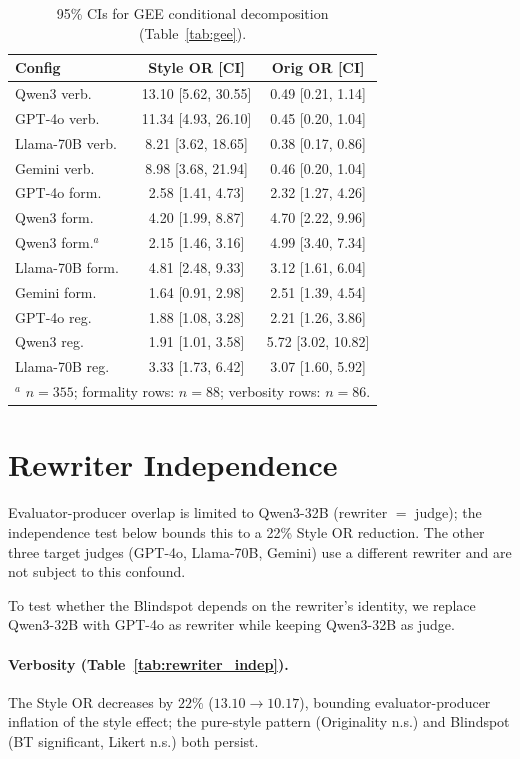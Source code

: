 \begin{table}[h]
\centering
\small
\caption{95\% CIs for GEE conditional decomposition (Table~\ref{tab:gee}).}
\label{tab:gee_ci}
\begin{tabular}{@{}lcc@{}}
\toprule
Config & Style OR [CI] & Orig OR [CI] \\
\midrule
Qwen3 verb.\ & 13.10 [5.62, 30.55] & 0.49 [0.21, 1.14] \\
GPT-4o verb.\ & 11.34 [4.93, 26.10] & 0.45 [0.20, 1.04] \\
Llama-70B verb.\ & 8.21 [3.62, 18.65] & 0.38 [0.17, 0.86] \\
Gemini verb.\ & 8.98 [3.68, 21.94] & 0.46 [0.20, 1.04] \\
GPT-4o form.\ & 2.58 [1.41, 4.73] & 2.32 [1.27, 4.26] \\
Qwen3 form.\ & 4.20 [1.99, 8.87] & 4.70 [2.22, 9.96] \\
Qwen3 form.$^a$ & 2.15 [1.46, 3.16] & 4.99 [3.40, 7.34] \\
Llama-70B form.\ & 4.81 [2.48, 9.33] & 3.12 [1.61, 6.04] \\
Gemini form.\ & 1.64 [0.91, 2.98] & 2.51 [1.39, 4.54] \\
GPT-4o reg.\ & 1.88 [1.08, 3.28] & 2.21 [1.26, 3.86] \\
Qwen3 reg.\ & 1.91 [1.01, 3.58] & 5.72 [3.02, 10.82] \\
Llama-70B reg.\ & 3.33 [1.73, 6.42] & 3.07 [1.60, 5.92] \\
\bottomrule
\multicolumn{3}{l}{\footnotesize $^a$ $n = 355$; formality rows: $n = 88$; verbosity rows: $n = 86$.}
\end{tabular}
\end{table}

\section{Rewriter Independence}
\label{app:rewriter_indep}

Evaluator-producer overlap is limited to Qwen3-32B (rewriter $=$ judge); the independence test below bounds this to a 22\% Style OR reduction. The other three target judges (GPT-4o, Llama-70B, Gemini) use a different rewriter and are not subject to this confound.

To test whether the Blindspot depends on the rewriter's identity, we replace Qwen3-32B with GPT-4o as rewriter while keeping Qwen3-32B as judge.

\paragraph{Verbosity (Table~\ref{tab:rewriter_indep}).}
The Style OR decreases by $22\%$ ($13.10 \to 10.17$), bounding evaluator-producer inflation of the style effect; the pure-style pattern (Originality n.s.) and Blindspot (BT significant, Likert n.s.) both persist.

